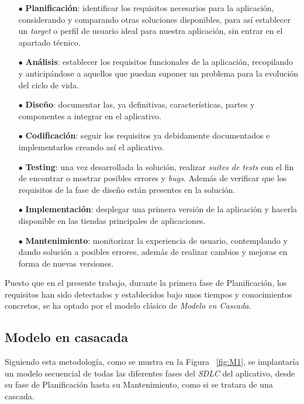 \begin{itemize}
   \item[$\bullet$] \textbf{Planificación}: identificar los requisitos necesarios para la aplicación,
   considerando y comparando otras soluciones disponibles, para así establecer un \textit{target} o perfil de usuario ideal
   para nuestra aplicación, sin entrar en el apartado técnico.
   \item[$\bullet$] \textbf{Análisis}: establecer los requisitos funcionales de la aplicación, recopilando 
   y anticipándose a aquellos que puedan suponer un problema para la evolución del ciclo de vida.
   \item[$\bullet$] \textbf{Diseño}: documentar las, ya definitivas, características, partes y componentes a integrar en el aplicativo.
   \item[$\bullet$] \textbf{Codificación}: seguir los requisitos ya debidamente documentados e implementarlos creando así el aplicativo. 
   \item[$\bullet$] \textbf{Testing}: una vez desarrollada la solución, realizar \textit{suites de tests} con el fin de encontrar o mostrar
   posibles errores y \textit{bugs}. Además de verificar que los requisitos de la fase de diseño están presentes en la solución.  
   \item[$\bullet$] \textbf{Implementación}: desplegar una primera versión de la aplicación y hacerla disponible en las tiendas principales
   de aplicaciones. 
   \item[$\bullet$] \textbf{Mantenimiento}: monitorizar la experiencia de usuario, contemplando y dando solución a posibles errores,
   además de realizar cambios y mejoras en forma de nuevas versiones.
\end{itemize}

Puesto que en el presente trabajo, durante la primera fase de Planificación, los requisitos han sido detectados y establecidos bajo unos tiempos 
y conocimientos concretos, se ha optado por el modelo clásico de \textit{Modelo en Cascada}.

\subsection{Modelo en casacada} %

Siguiendo esta metodología, como se mustra en la Figura ~\ref{fig:M1}, se implantaría un modelo secuencial de todas las diferentes fases del 
\textit{SDLC} del aplicativo, 
desde su fase de Planificación hasta su Mantenimiento, como si se tratara de una cascada.


